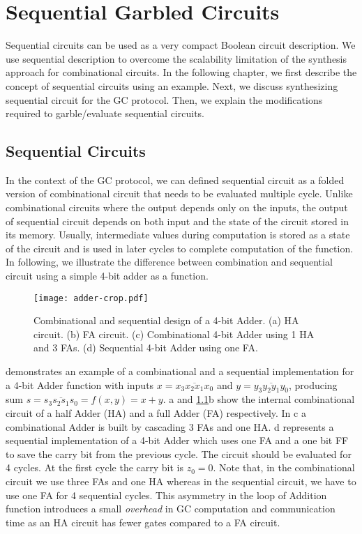 \chapter{Sequential Garbled Circuits}\label{chap:seq}
Sequential circuits can be used as a very compact Boolean circuit description. We use sequential description to overcome the scalability limitation of the synthesis approach for combinational circuits.
In the following chapter, we first describe the concept of sequential circuits using an example.
Next, we discuss synthesizing sequential circuit for the GC protocol.
Then, we explain the modifications required to garble/evaluate sequential circuits.

\section{Sequential Circuits}
In the context of the GC protocol, we can defined sequential circuit as a folded version of combinational circuit that needs to be evaluated multiple cycle.
Unlike combinational circuits where the output depends only on the inputs, the output of sequential circuit depends on both input and the state of the circuit stored in its memory.
Usually, intermediate values during computation is stored as a state of the circuit and is used in later cycles to complete computation of the function.
In following, we illustrate the difference between combination and sequential circuit using a simple 4-bit adder as a function.

\begin{figure}[ht]
    \centering
    \texttt{[image: adder-crop.pdf]}
    \caption{Combinational and sequential design of a 4-bit Adder.
  (a) HA circuit.
  (b) FA circuit.
  (c) Combinational 4-bit Adder using 1 HA and 3 FAs.
  (d) Sequential 4-bit Adder using one FA.}\label{fig:combSeq}
\end{figure}

 demonstrates an example of a combinational and a sequential implementation for a 4-bit Adder function with inputs $x = \overline{x_3x_2x_1x_0}$ and $y = \overline{y_3y_2y_1y_0}$, producing sum $s  = \overline{s_3s_2s_1s_0} = f(x, y) = x + y$.
a and \ref{fig:combSeq}b show the internal combinational circuit of a half Adder (HA) and a full Adder (FA) respectively.
In c a combinational Adder is built by cascading 3 FAs and one HA.
d represents a sequential implementation of a 4-bit Adder which uses one FA and a one bit FF to save the carry bit from the previous cycle.
The circuit should be evaluated for 4 cycles.
At the first cycle the carry bit is $z_0=0$.
Note that, in the combinational circuit we use three FAs and one HA whereas in the sequential circuit, we have to use one FA for 4 sequential cycles.
This asymmetry in the loop of Addition function introduces a small \emph{overhead} in GC computation and communication time as an HA circuit has fewer gates compared to a FA circuit.

